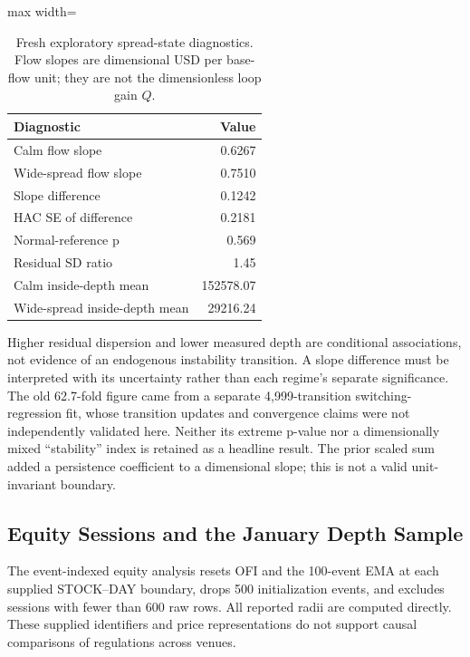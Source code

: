 \documentclass[12pt]{article}
\theoremstyle{definition}
\theoremstyle{remark}
\begin{document}
\begin{table}[htbp]
\centering\small
\caption{Fresh exploratory spread-state diagnostics. Flow slopes are dimensional USD per base-flow unit; they are not the dimensionless loop gain $Q$.}
\label{tab:stress_revised}
\begin{adjustbox}{max width=\textwidth}
\begin{tabular}{lr}\toprule
Diagnostic & Value \\\midrule
Calm flow slope & 0.6267 \\
Wide-spread flow slope & 0.7510 \\
Slope difference & 0.1242 \\
HAC SE of difference & 0.2181 \\
Normal-reference p & 0.569 \\
Residual SD ratio & 1.45 \\
Calm inside-depth mean & 152578.07 \\
Wide-spread inside-depth mean & 29216.24 \\
\bottomrule\end{tabular}
\end{adjustbox}
\end{table}

Higher residual dispersion and lower measured depth are conditional associations, not evidence of an endogenous instability transition. A slope difference must be interpreted with its uncertainty rather than each regime's separate significance. The old 62.7-fold figure came from a separate 4,999-transition switching-regression fit, whose transition updates and convergence claims were not independently validated here. Neither its extreme p-value nor a dimensionally mixed ``stability'' index is retained as a headline result. The prior scaled sum added a persistence coefficient to a dimensional slope; this is not a valid unit-invariant boundary.

\subsection{Equity Sessions and the January Depth Sample}
The event-indexed equity analysis resets OFI and the 100-event EMA at each supplied STOCK--DAY boundary, drops 500 initialization events, and excludes sessions with fewer than 600 raw rows. All reported radii are computed directly. These supplied identifiers and price representations do not support causal comparisons of regulations across venues.
\end{document}
